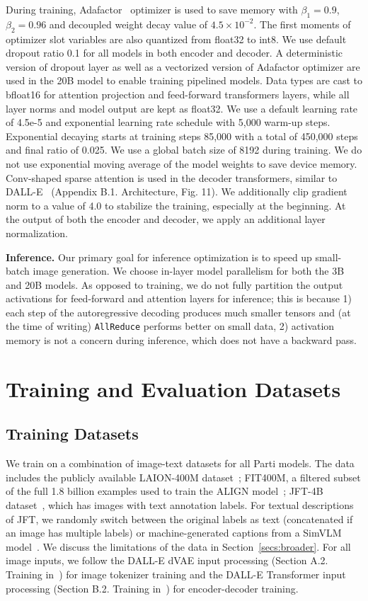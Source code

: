 During training, Adafactor~\cite{shazeer2018adafactor} optimizer is used to save memory with $\beta_1 = 0.9$, $\beta_2 = 0.96$ and decoupled weight decay value of $4.5\times 10^{-2}$. The first moments of optimizer slot variables are also quantized from float32 to int8. We use default dropout ratio 0.1 for all models in both encoder and decoder. A deterministic version of dropout layer as well as a vectorized version of Adafactor optimizer are used in the 20B model to enable training pipelined models. Data types are cast to bfloat16 for attention projection and feed-forward transformers layers, while all layer norms and model output are kept as float32. We use a default learning rate of 4.5e-5 and exponential learning rate schedule with 5,000 warm-up steps. Exponential decaying starts at training steps 85,000 with a total of 450,000 steps and final ratio of 0.025. We use a global batch size of 8192 during training. We do not use exponential moving average of the model weights to save device memory. Conv-shaped sparse attention is used in the decoder transformers, similar to DALL-E~\cite{ramesh2021zero} (Appendix B.1. Architecture, Fig. 11). We additionally clip gradient norm to a value of 4.0 to stabilize the training, especially at the beginning. At the output of both the encoder and decoder, we apply an additional layer normalization.

\textbf{Inference.} Our primary goal for inference optimization is to speed up small-batch image generation. We choose in-layer model parallelism for both the 3B and 20B models. As opposed to training, we do not fully partition the output activations for feed-forward and attention layers for inference; this is because 1) each step of the autoregressive decoding produces much smaller tensors and (at the time of writing) \texttt{AllReduce} performs better on small data, 2) activation memory is not a concern during inference, which does not have a backward pass.

\section{Training and Evaluation Datasets}
\subsection{Training Datasets}
\label{secs:data}

We train on a combination of image-text datasets for all Parti models. The data includes the publicly available LAION-400M dataset~\cite{schuhmann2021laion}; FIT400M, a filtered subset of the full 1.8 billion examples used to train the ALIGN model~\cite{align-paper}; JFT-4B dataset~\cite{zhai2021scaling}, which has images with text annotation labels. For textual descriptions of JFT, we randomly switch between the original labels as text (concatenated if an image has multiple labels) or machine-generated captions from a SimVLM model~\cite{wang2021simvlm}. We discuss the limitations of the data in Section~\ref{secs:broader}. For all image inputs, we follow the DALL-E dVAE input processing (Section A.2. Training in~\cite{ramesh2021zero}) for image tokenizer training and the DALL-E Transformer input processing (Section B.2. Training in~\cite{ramesh2021zero}) for encoder-decoder training.

